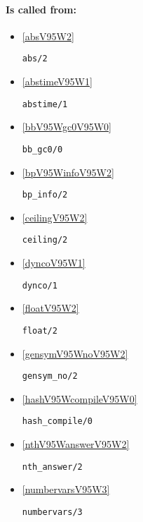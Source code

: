 \paragraph{Is called from:} 
\begin{itemize}
\item \ref{absV95W2} 
\begin{verbatim}
abs/2
\end{verbatim}

\item \ref{abstimeV95W1} 
\begin{verbatim}
abstime/1
\end{verbatim}

\item \ref{bbV95Wgc0V95W0} 
\begin{verbatim}
bb_gc0/0
\end{verbatim}

\item \ref{bpV95WinfoV95W2} 
\begin{verbatim}
bp_info/2
\end{verbatim}

\item \ref{ceilingV95W2} 
\begin{verbatim}
ceiling/2
\end{verbatim}

\item \ref{dyncoV95W1} 
\begin{verbatim}
dynco/1
\end{verbatim}

\item \ref{floatV95W2} 
\begin{verbatim}
float/2
\end{verbatim}

\item \ref{gensymV95WnoV95W2} 
\begin{verbatim}
gensym_no/2
\end{verbatim}

\item \ref{hashV95WcompileV95W0} 
\begin{verbatim}
hash_compile/0
\end{verbatim}

\item \ref{nthV95WanswerV95W2} 
\begin{verbatim}
nth_answer/2
\end{verbatim}

\item \ref{numbervarsV95W3} 
\begin{verbatim}
numbervars/3
\end{verbatim}


\end{itemize}
